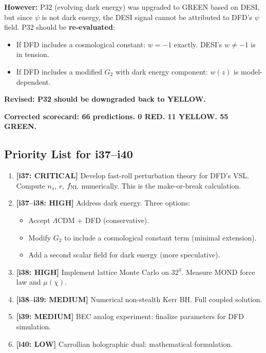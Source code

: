 \documentclass[11pt,a4paper]{article}
\newcommand{\YELLOW}{\textcolor{dfdyellow}{\textbf{YELLOW}}}
\begin{document}
\textbf{However:} P32 (evolving dark energy) was upgraded to GREEN based on DESI, but since $\psi$ is not dark energy, the DESI signal cannot be attributed to DFD's $\psi$ field. P32 should be \textbf{re-evaluated}:
\begin{itemize}
\item If DFD includes a cosmological constant: $w = -1$ exactly. DESI's $w \neq -1$ is in tension.
\item If DFD includes a modified $G_2$ with dark energy component: $w(z)$ is model-dependent.
\end{itemize}

\textbf{Revised: P32 should be downgraded back to \YELLOW.}

\textbf{Corrected scorecard: 66 predictions. 0 RED. 11 YELLOW. 55 GREEN.}

\subsection{Priority List for i37--i40}

\begin{enumerate}
\item \textbf{[i37: CRITICAL]} Develop fast-roll perturbation theory for DFD's VSL. Compute $n_s$, $r$, $f_{\rm NL}$ numerically. This is the make-or-break calculation.

\item \textbf{[i37--i38: HIGH]} Address dark energy. Three options:
\begin{itemize}
\item[(a)] Accept $\Lambda$CDM + DFD (conservative).
\item[(b)] Modify $G_2$ to include a cosmological constant term (minimal extension).
\item[(c)] Add a second scalar field for dark energy (more speculative).
\end{itemize}

\item \textbf{[i38: HIGH]} Implement lattice Monte Carlo on $32^4$. Measure MOND force law and $\mu(\chi)$.

\item \textbf{[i38--i39: MEDIUM]} Numerical non-stealth Kerr BH. Full coupled solution.

\item \textbf{[i39: MEDIUM]} BEC analog experiment: finalize parameters for DFD simulation.

\item \textbf{[i40: LOW]} Carrollian holographic dual: mathematical formulation.
\end{enumerate}
\end{document}
